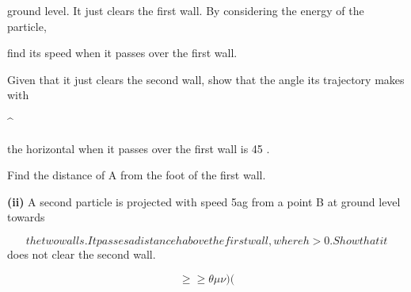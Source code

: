 \documentclass[12pt]{article}
\begin{document}
\begin{flushleft}
ground level. It just clears the first wall. By considering the energy of the particle,\par
find its speed when it passes over the first wall.\par
Given that it just clears the second wall, show that the angle its trajectory makes with\par
\textasciicircum{}\circ\par
the horizontal when it passes over the first wall is 45 .\par
Find the distance of A from the foot of the first wall.\par
\textbf{(ii)} A second particle is projected with speed \sqrt5ag from a point B at ground level towards\par
\[the two walls. It passes a distance h above the first wall, where h > 0. Show that it\]
does not clear the second wall.\par
\[\geq\geq\theta\mu\nu) (\]
\end{flushleft}
\end{document}

